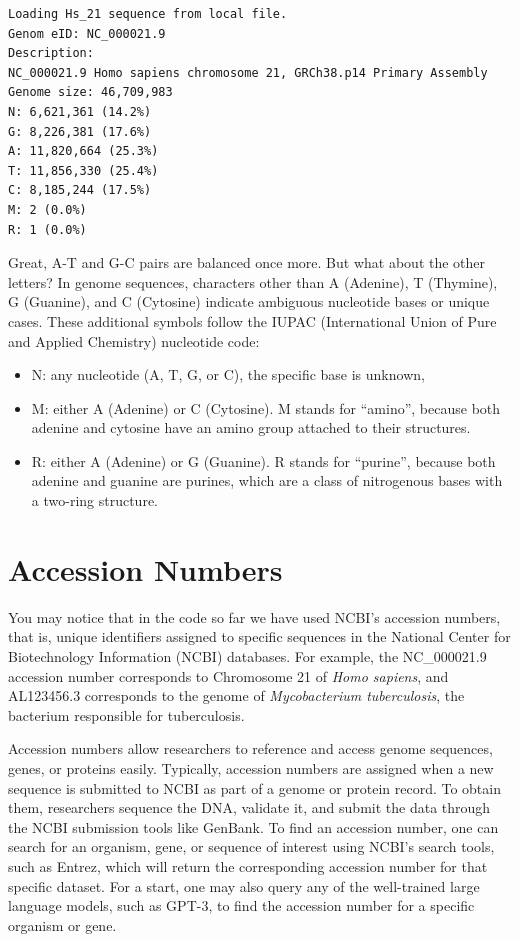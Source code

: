 \vspace*{3mm}
\begin{lstlisting}
Loading Hs_21 sequence from local file.
Genom eID: NC_000021.9
Description: 
NC_000021.9 Homo sapiens chromosome 21, GRCh38.p14 Primary Assembly
Genome size: 46,709,983
N: 6,621,361 (14.2%)
G: 8,226,381 (17.6%)
A: 11,820,664 (25.3%)
T: 11,856,330 (25.4%)
C: 8,185,244 (17.5%)
M: 2 (0.0%)
R: 1 (0.0%)
\end{lstlisting}

Great, A-T and G-C pairs are balanced once more. But what about the other letters? In genome sequences, characters other than A (Adenine), T (Thymine), G (Guanine), and C (Cytosine) indicate ambiguous nucleotide bases or unique cases. These additional symbols follow the IUPAC (International Union of Pure and Applied Chemistry) nucleotide code:

\begin{itemize}
\item N: any nucleotide (A, T, G, or C), the specific base is unknown,
\item M: either A (Adenine) or C (Cytosine). M stands for ``amino'', because both adenine and cytosine have an amino group attached to their structures.
\item R: either A (Adenine) or G (Guanine). R stands for ``purine'', because both adenine and guanine are purines, which are a class of nitrogenous bases with a two-ring structure.
\end{itemize}

\section*{Accession Numbers}

You may notice that in the code so far we have used NCBI's accession numbers, that is, unique identifiers assigned to specific sequences in the National Center for Biotechnology Information (NCBI) databases. For example, the NC\_000021.9 accession number corresponds to Chromosome 21 of {\em Homo sapiens}, and AL123456.3 corresponds to the genome of {\em Mycobacterium tuberculosis}, the bacterium responsible for tuberculosis.

Accession numbers allow researchers to reference and access genome sequences, genes, or proteins easily. Typically, accession numbers are assigned when a new sequence is submitted to NCBI as part of a genome or protein record. To obtain them, researchers sequence the DNA, validate it, and submit the data through the NCBI submission tools like GenBank. To find an accession number, one can search for an organism, gene, or sequence of interest using NCBI’s search tools, such as Entrez, which will return the corresponding accession number for that specific dataset. For a start, one may also query any of the well-trained large language models, such as GPT-3, to find the accession number for a specific organism or gene.

